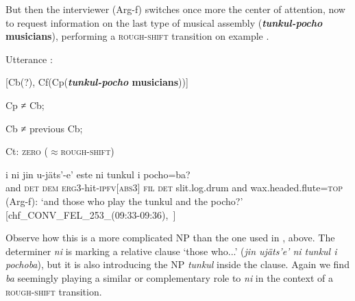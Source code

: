 \documentclass[output=paper
,modfonts
,nonflat]{langsci/langscibook}
\begin{document}
But then the interviewer (Arg-f) switches once more the center of attention, now to request information on the last type of musical assembly (\textbf{\textit{tunkul-pocho} musicians}), performing a \textsc{rough-shift} transition on example . 

\ea
Utterance :

[Cb(?), Cf(Cp(\textbf{\textit{tunkul-pocho} musicians}))]

Cp ≠ Cb;

Cb ≠ previous Cb;

Ct: \textsc{zero ($\approx$rough-shift)}
\z

\ea{}
\label{ex:pico:49}

\gll i ni jin  u-j\"ats'-e' este ni tunkul i pocho=ba?\\
and \textsc{det}  \textsc{dem} \textsc{erg3}-hit-\textsc{ipfv[abs3]} \textsc{fil} \textsc{det} slit.log.drum and wax.headed.flute=\textsc{top}\\
\glt (Arg-f): `and those who play the tunkul and the pocho?' [chf\_CONV\_FEL\_253\_(09:33-09:36),~\citealt{Delgado-Galvan2018archive}]
\z



Observe how this is a more complicated NP than the one used in , above. The determiner \textit{ni} is marking a relative clause `those who...' (\textit{jin  uj\"ats'e' ni tunkul i pochoba}), but it is also introducing the NP \textit{tunkul} inside the clause. Again we find \textit{ba} seemingly playing a similar or complementary role to \textit{ni} in the context of a \textsc{rough-shift} transition.
\end{document}
